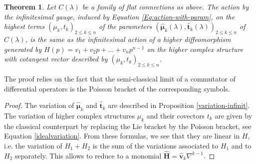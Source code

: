 \documentclass[11pt]{amsart}
\newtheorem{thm}{Theorem}
\numberwithin{thm}{section} %
\numberwithin{equation}{section} %
\numberwithin{figure}{section} %
\renewcommand*{\l}{\lambda}
\begin{document}
\begin{thm}\label{actionsymponlambdaconn}
Let $C(\l)$ be a family of flat connections as above. The action by the infinitesimal gauge, induced by Equation \eqref{Eq:action-with-param}, on the highest terms $(\mu_k,t_k)_{2\leq k\leq n}$ of the parameters $(\bm\hat{\mu}_k(\l),\bm\hat{t}_k(\l))_{2\leq k\leq n}$  of $C(\l)$, is the same as the infinitesimal action of a higher diffeomorphism generated by $H(p)=v_1+v_2p+...+v_np^{n-1}$ on the higher complex structure with cotangent vector described by $(\mu_k,t_k)_{2\leq k\leq n}$.
\end{thm}
The proof relies on the fact that the semi-classical limit of a commutator of differential operators is the Poisson bracket of the corresponding symbols. 

\begin{proof}
The variation of $\bm\hat{\mu}_k$ and $\bm\hat{t}_k$ are described in Proposition \ref{variation-infinit}. The variation of higher complex structures $\mu_k$ and their covectors $t_k$ are given by the classical counterpart by replacing the Lie bracket by the Poisson bracket, see Equation \eqref{idealvariation}. From these formulas, we see that they are linear in $H$, i.e. the variation of $H_1+H_2$ is the sum of the variations associated to $H_1$ and to $H_2$ separately. This allows to reduce to a monomial $\bm\hat{H}=\bm\hat{v}_k\nabla^{k-1}$.


\end{proof}
\end{document}
